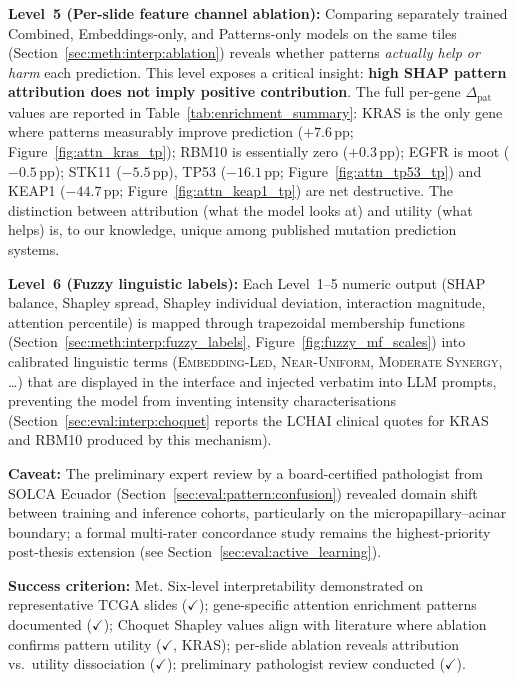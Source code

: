 \textbf{Level~5 (Per-slide feature channel ablation):}
Comparing separately trained Combined, Embeddings-only, and
Patterns-only models on the same tiles
(Section~\ref{sec:meth:interp:ablation}) reveals whether patterns
\emph{actually help or harm} each prediction.
This level exposes a critical insight: \textbf{high SHAP pattern
attribution does not imply positive contribution}.
The full per-gene $\Delta_{\mathrm{pat}}$ values are reported in
Table~\ref{tab:enrichment_summary}: KRAS is the only gene where
patterns measurably improve prediction
($+7.6$\,pp; Figure~\ref{fig:attn_kras_tp}); RBM10 is essentially
zero ($+0.3$\,pp); EGFR is moot ($-0.5$\,pp); STK11
($-5.5$\,pp), TP53 ($-16.1$\,pp; Figure~\ref{fig:attn_tp53_tp}) and
KEAP1 ($-44.7$\,pp; Figure~\ref{fig:attn_keap1_tp}) are net
destructive.
The distinction between attribution (what the model looks at) and
utility (what helps) is, to our knowledge, unique among published
mutation prediction systems.

\textbf{Level~6 (Fuzzy linguistic labels):}
Each Level~1--5 numeric output (SHAP balance, Shapley spread,
Shapley individual deviation, interaction magnitude, attention
percentile) is mapped through trapezoidal membership functions
(Section~\ref{sec:meth:interp:fuzzy_labels},
Figure~\ref{fig:fuzzy_mf_scales}) into calibrated linguistic terms
(\textsc{Embedding-Led}, \textsc{Near-Uniform},
\textsc{Moderate Synergy}, \ldots) that are displayed in the
interface and injected verbatim into LLM prompts, preventing the
model from inventing intensity characterisations
(Section~\ref{sec:eval:interp:choquet} reports the LCHAI clinical
quotes for KRAS and RBM10 produced by this mechanism).

\textbf{Caveat:} The preliminary expert review by a board-certified
pathologist from SOLCA Ecuador
(Section~\ref{sec:eval:pattern:confusion}) revealed domain shift
between training and inference cohorts, particularly on the
micropapillary--acinar boundary; a formal multi-rater concordance
study remains the highest-priority post-thesis extension
(see Section~\ref{sec:eval:active_learning}).

\textbf{Success criterion:} Met.
Six-level interpretability demonstrated on representative TCGA
slides ($\checkmark$); gene-specific attention enrichment patterns
documented ($\checkmark$); Choquet Shapley values align with
literature where ablation confirms pattern utility ($\checkmark$,
KRAS); per-slide ablation reveals attribution vs.\ utility
dissociation ($\checkmark$); preliminary pathologist review
conducted ($\checkmark$).
 
